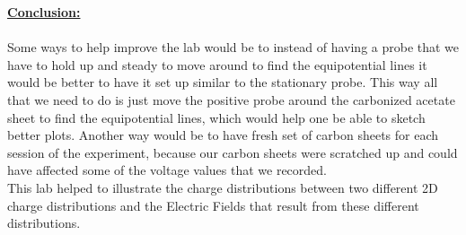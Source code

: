 \documentclass{report}
\newcommand\tab[1][1cm]{\hspace*{#1}}
\begin{document}
\begin{flushleft}
\newpage

{\Large \textbf{\underline{Conclusion:}}}
\\\hspace{.1in}\\
{\large
\tab Some ways to help improve the lab would be to instead of having a probe that we have to hold up and steady to move around to find the equipotential lines it would be better to have it set up similar to the stationary probe. This way all that we need to do is just move the positive probe around the carbonized acetate sheet to find the equipotential lines, which would help one be able to sketch better plots. Another way would be to have fresh set of carbon sheets for each session of the experiment, because our carbon sheets were scratched up and could have affected some of the voltage values that we recorded.
\\
\tab This lab helped to illustrate the charge distributions between two different 2D charge distributions and the Electric Fields that result from these different distributions.
}

\end{flushleft}
\end{document}
